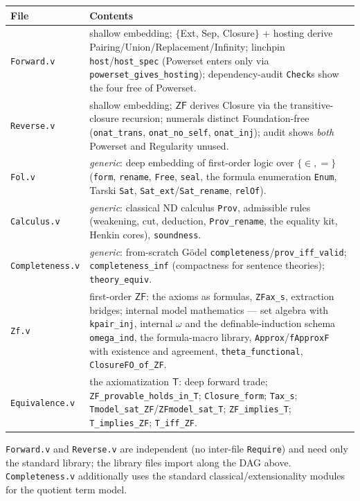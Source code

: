 \documentclass[11pt]{article}
\theoremstyle{plain}
\theoremstyle{definition}
\newcommand{\ZF}{\mathsf{ZF}}
\renewcommand{\ZF}{\textsf{ZF}}
\newcommand{\T}{\textsf{T}}
\newcommand{\cq}[1]{\lstinline[basicstyle=\ttfamily]|#1|}
\begin{document}
\begin{center}
\renewcommand{\arraystretch}{1.25}
\begin{tabular}{@{}lp{}@{}}
\toprule
File & Contents \\
\midrule
\texttt{Forward.v} & shallow embedding; $\{$Ext, Sep, Closure$\}$ + hosting derive Pairing/Union/Replacement/Infinity; linchpin \cq{host}/\cq{host_spec} (Powerset enters only via \cq{powerset_gives_hosting}); dependency-audit \cq{Check}s show the four free of Powerset. \\
\texttt{Reverse.v} & shallow embedding; $\ZF$ derives Closure via the transitive-closure recursion; numerals distinct Foundation-free (\cq{onat_trans}, \cq{onat_no_self}, \cq{onat_inj}); audit shows \emph{both} Powerset and Regularity unused. \\
\texttt{Fol.v} & \emph{generic}: deep embedding of first-order logic over $\{\in,=\}$ (\cq{form}, \cq{rename}, \cq{Free}, \cq{seal}, the formula enumeration \cq{Enum}, Tarski \cq{Sat}, \cq{Sat_ext}/\cq{Sat_rename}, \cq{relOf}). \\
\texttt{Calculus.v} & \emph{generic}: classical ND calculus \cq{Prov}, admissible rules (weakening, cut, deduction, \cq{Prov_rename}, the equality kit, Henkin cores), \cq{soundness}. \\
\texttt{Completeness.v} & \emph{generic}: from-scratch G\"odel \cq{completeness}/\cq{prov_iff_valid}; \cq{completeness_inf} (compactness for sentence theories); \cq{theory_equiv}. \\
\texttt{Zf.v} & first-order $\ZF$: the axioms as formulas, \cq{ZFax_s}, extraction bridges; internal model mathematics --- set algebra with \cq{kpair_inj}, internal $\omega$ and the definable-induction schema \cq{omega_ind}, the formula-macro library, \cq{Approx}/\cq{fApproxF} with existence and agreement, \cq{theta_functional}, \cq{ClosureFO_of_ZF}. \\
\texttt{Equivalence.v} & the axiomatization $\T$: deep forward trade; \cq{ZF_provable_holds_in_T}; \cq{Closure_form}; \cq{Tax_s}; \cq{Tmodel_sat_ZF}/\cq{ZFmodel_sat_T}; \cq{ZF_implies_T}; \cq{T_implies_ZF}; \cq{T_iff_ZF}. \\
\bottomrule
\end{tabular}
\end{center}

\texttt{Forward.v} and \texttt{Reverse.v} are independent (no inter-file
\cq{Require}) and need only the standard library; the library files import along
the DAG above. \texttt{Completeness.v} additionally uses the standard
classical/extensionality modules for the quotient term model.
\end{document}
